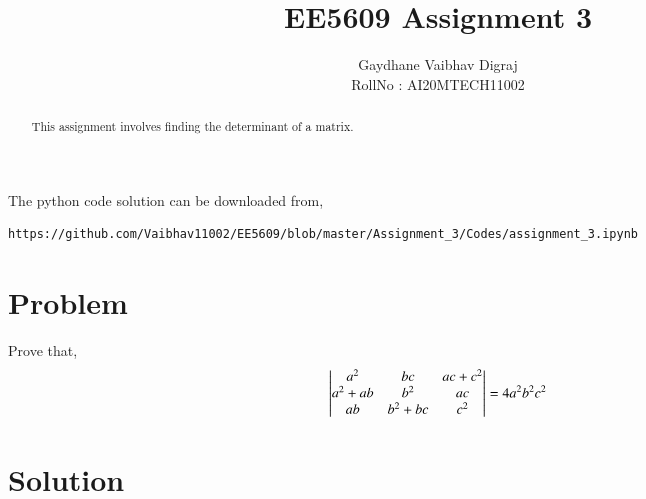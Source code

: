 \documentclass[journal,12pt,twocolumn]{IEEEtran}
\begin{document}
    \def\rightbox#1{\makebox[0in][r]{#1}}
 \def\centbox#1{\makebox[0in]{#1}}
     \def\topbox#1{\raisebox{-\baselineskip}[0in][0in]{#1}}
     \def\midbox#1{\raisebox{-0.5\baselineskip}[0in][0in]{#1}}
\vspace{3cm}
\title{EE5609 Assignment 3}
\author{Gaydhane Vaibhav Digraj \\ RollNo : AI20MTECH11002 }
\maketitle
\newpage
\bigskip
\renewcommand{\thefigure}{\theenumi}
\renewcommand{\thetable}{\theenumi}
\begin{abstract}
This assignment involves finding the determinant of a matrix.
\end{abstract}
The python code solution can be downloaded from,
\begin{lstlisting}
https://github.com/Vaibhav11002/EE5609/blob/master/Assignment_3/Codes/assignment_3.ipynb
\end{lstlisting}
\section{Problem}
Prove that, 
\begin{align*}
    \begin{vmatrix}a^2 & bc & ac+c^2 \\ a^2+ab & b^2 & ac \\ ab & b^2+bc & c^2\end{vmatrix} = 4a^2b^2c^2
\end{align*}

\section{Solution}
\end{document}

